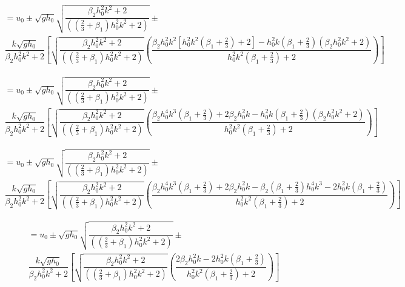 \documentclass[10pt]{article}
\begin{document}
\begin{multline*}
= u_0  \pm  \sqrt{gh_0} \sqrt{\dfrac{\beta_2 h_0^2 k^2 + 2}{\left( \left(\frac{2}{3} + \beta_1\right) h_0^2 k^2 + 2\right)} } \pm \\ \dfrac{k\sqrt{gh_0}}{\beta_2 h_0^2 k^2 +2} \left[\sqrt{\dfrac{\beta_2 h_0^2 k^2 + 2}{\left( \left(\frac{2}{3} + \beta_1\right) h_0^2 k^2 + 2\right)} } \left(  \dfrac{\beta_2 h_0^2 k^2 \left[h_0^2 k^2 \left(\beta_1 + \frac{2}{3}\right) + 2\right] -h_0^2 k \left(\beta_1 + \frac{2}{3}\right)\left(\beta_2h_0^2k^2 + 2\right)}{h_0^2 k^2 \left(\beta_1 + \frac{2}{3}\right) + 2} \right)\right]
\end{multline*} 

\begin{multline*}
= u_0  \pm  \sqrt{gh_0} \sqrt{\dfrac{\beta_2 h_0^2 k^2 + 2}{\left( \left(\frac{2}{3} + \beta_1\right) h_0^2 k^2 + 2\right)} } \pm \\ \dfrac{k\sqrt{gh_0}}{\beta_2 h_0^2 k^2 +2} \left[\sqrt{\dfrac{\beta_2 h_0^2 k^2 + 2}{\left( \left(\frac{2}{3} + \beta_1\right) h_0^2 k^2 + 2\right)} } \left(  \dfrac{  \beta_2 h_0^4 k^3 \left(\beta_1 + \frac{2}{3}\right)  + 2\beta_2 h_0^2 k -h_0^2 k \left(\beta_1 + \frac{2}{3}\right)\left(\beta_2h_0^2k^2 + 2\right)}{h_0^2 k^2 \left(\beta_1 + \frac{2}{3}\right) + 2} \right)\right]
\end{multline*} 

\begin{multline*}
= u_0  \pm  \sqrt{gh_0} \sqrt{\dfrac{\beta_2 h_0^2 k^2 + 2}{\left( \left(\frac{2}{3} + \beta_1\right) h_0^2 k^2 + 2\right)} } \pm \\ \dfrac{k\sqrt{gh_0}}{\beta_2 h_0^2 k^2 +2} \left[\sqrt{\dfrac{\beta_2 h_0^2 k^2 + 2}{\left( \left(\frac{2}{3} + \beta_1\right) h_0^2 k^2 + 2\right)} } \left(  \dfrac{  \beta_2 h_0^4 k^3 \left(\beta_1 + \frac{2}{3}\right)  + 2\beta_2 h_0^2 k -  \beta_2\left(\beta_1 + \frac{2}{3}\right)h_0^4k^3 -    2 h_0^2 k \left(\beta_1 + \frac{2}{3}\right)}{h_0^2 k^2 \left(\beta_1 + \frac{2}{3}\right) + 2} \right)\right]
\end{multline*} 


\begin{multline*}
= u_0  \pm  \sqrt{gh_0} \sqrt{\dfrac{\beta_2 h_0^2 k^2 + 2}{\left( \left(\frac{2}{3} + \beta_1\right) h_0^2 k^2 + 2\right)} } \pm \\ \dfrac{k\sqrt{gh_0}}{\beta_2 h_0^2 k^2 +2} \left[\sqrt{\dfrac{\beta_2 h_0^2 k^2 + 2}{\left( \left(\frac{2}{3} + \beta_1\right) h_0^2 k^2 + 2\right)} } \left(  \dfrac{  2\beta_2 h_0^2 k  -    2 h_0^2 k \left(\beta_1 + \frac{2}{3}\right)}{h_0^2 k^2 \left(\beta_1 + \frac{2}{3}\right) + 2} \right)\right]
\end{multline*} 
\end{document}
